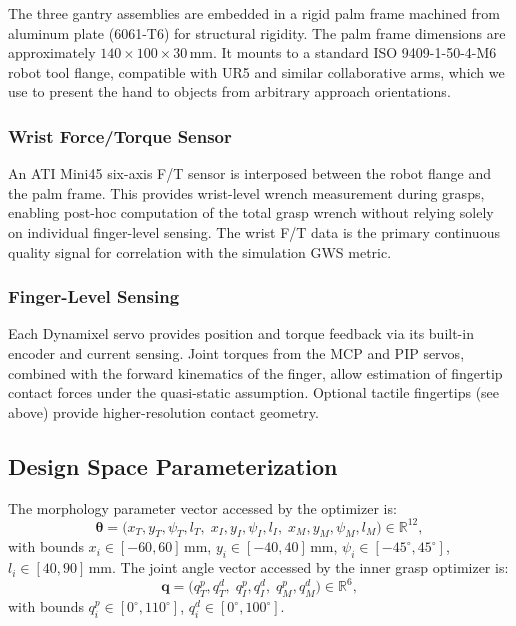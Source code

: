 \documentclass[journal]{IEEEtran}
\newcommand{\btheta}{\boldsymbol{\theta}}
\newcommand{\bq}{\mathbf{q}}
\newcommand{\R}{\mathbb{R}}
\begin{document}
The three gantry assemblies are embedded in a rigid palm frame machined from aluminum
plate (6061-T6) for structural rigidity.
The palm frame dimensions are approximately $140\times100\times30$\,mm.
It mounts to a standard ISO 9409-1-50-4-M6 robot tool flange, compatible with UR5 and
similar collaborative arms, which we use to present the hand to objects from arbitrary
approach orientations.

\subsubsection{Wrist Force/Torque Sensor}

An ATI Mini45 six-axis F/T sensor is interposed between the robot flange and the palm
frame.
This provides wrist-level wrench measurement during grasps, enabling post-hoc computation
of the total grasp wrench without relying solely on individual finger-level sensing.
The wrist F/T data is the primary continuous quality signal for correlation with the
simulation GWS metric.

\subsubsection{Finger-Level Sensing}

Each Dynamixel servo provides position and torque feedback via its built-in encoder and
current sensing.
Joint torques from the MCP and PIP servos, combined with the forward kinematics of the
finger, allow estimation of fingertip contact forces under the quasi-static assumption.
Optional tactile fingertips (see above) provide higher-resolution contact geometry.

\subsection{Design Space Parameterization}

The morphology parameter vector accessed by the optimizer is:
\begin{equation}
  \btheta = \big(x_T, y_T, \psi_T, l_T,\;
                  x_I, y_I, \psi_I, l_I,\;
                  x_M, y_M, \psi_M, l_M\big)
  \in \R^{12},
  \label{eq:morphology}
\end{equation}
with bounds $x_i \in [-60, 60]$\,mm, $y_i \in [-40, 40]$\,mm,
$\psi_i \in [-45^\circ, 45^\circ]$, $l_i \in [40, 90]$\,mm.
The joint angle vector accessed by the inner grasp optimizer is:
\begin{equation}
  \bq = \big(q^p_T, q^d_T,\; q^p_I, q^d_I,\; q^p_M, q^d_M\big) \in \R^6,
  \label{eq:control}
\end{equation}
with bounds $q^p_i \in [0^\circ, 110^\circ]$, $q^d_i \in [0^\circ, 100^\circ]$.
\end{document}
